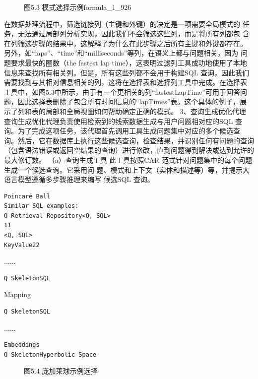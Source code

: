 \documentclass[12pt,a4paper,openright,UTF8]{ctexbook}
\begin{document}
\begin{figure}[htbp]
\centering
{}
\caption{图5.3 模式选择示例formula\_1\_926}
\end{figure}

在数据处理流程中，筛选链接列（主键和外键）的决定是一项需要全局模式的 任务，无法通过局部列分析实现，因此我们不会筛选这些列，而是将所有列都包 含在列筛选步骤的结果中，这解释了为什么在此步骤之后所有主键和外键都存在。 另外，如“laps”、“time”和“milliseconds”等列，在语义上都与问题相关，因为 问题要求最快的圈数（the fastest lap time），这表明过滤列工具成功地使用了本地 信息来查找所有相关列。但是，所有这些列都不会用于构建SQL 查询，因此我们 需要找到与其相对信息相关的列，这将在选择表和选择列工具中完成。在选择表 工具中，如图5.3中所示，由于有一个更相关的列“fastestLapTime”可用于回答问 题，因此选择表删除了包含所有时间信息的“lapTimes”表。这个具体的例子，展 示了列和表的局部和全局视图如何帮助确定正确的模式。 3、查询生成优化代理 查询生成优化代理负责使用检索到的线索数据生成与用户问题相对应的SQL 查询。为了完成这项任务，该代理首先调用工具生成问题集中对应的多个候选查 询。然后，它在数据库上执行这些候选查询，检查结果，并识别任何有问题的查询 （包含语法错误或返回空结果的查询）进行修改，直到问题得到解决或达到允许的 最大修订数。 （a）查询生成工具 此工具按照CAR 范式针对问题集中的每个问题生成一个候选查询。它采用问 题、模式和上下文（实体和描述等）等，并提示大语言模型遵循多步骤推理来编写 候选SQL 查询。

\begin{lstlisting}
Poincaré Ball
Similar SQL examples:
Q Retrieval Repository<Q, SQL>
11
<Q, SQL>
KeyValue22
\end{lstlisting}
......

\begin{lstlisting}
Q SkeletonSQL
\end{lstlisting}
Mapping

\begin{lstlisting}
Q SkeletonSQL
\end{lstlisting}
......

\begin{lstlisting}
Embeddings
Q SkeletonHyperbolic Space
\end{lstlisting}

\begin{figure}[htbp]
\centering
{}
\caption{图5.4 庞加莱球示例选择}
\end{figure}
\end{document}
